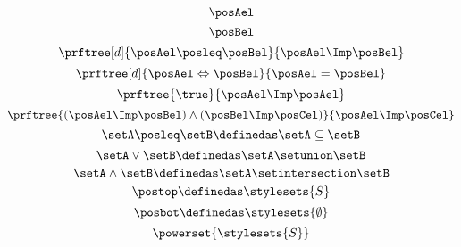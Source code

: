 {\begin{forslides}
\begin{equation*}
            \label{eq:latt_4}
            \posAel
        \end{equation*}
        \begin{equation*}
            \label{eq:latt_5}
            \posBel
        \end{equation*}
        \begin{equation*}
            \label{eq:prop_1}
            \prftree[d]{\posAel \posleq \posBel}{\posAel \Imp \posBel}
        \end{equation*}
        \begin{equation*}
            \label{eq:prop_2}
            \prftree[d]{\posAel \Leftrightarrow \posBel}{\posAel = \posBel}
        \end{equation*}
        \begin{equation*}
            \label{eq:prop_3}
            \prftree{\true}{\posAel \Imp \posAel}
        \end{equation*}
        \begin{equation*}
            \label{eq:prop_4}
            \prftree{(\posAel \Imp \posBel)\wedge (\posBel \Imp \posCel)}{\posAel \Imp \posCel}
        \end{equation*}
        \begin{equation*}
            \label{eq:pow_1}
            \setA \posleq \setB \definedas \setA \subseteq \setB
        \end{equation*}
        \begin{equation*}
            \label{eq:pow_2}
            \setA \vee \setB \definedas \setA \setunion \setB
        \end{equation*}
        \begin{equation*}
            \label{eq:pow_3}
            \setA \wedge \setB \definedas \setA \setintersection \setB
        \end{equation*}
        \begin{equation*}
            \label{eq:pow_4}
            \postop \definedas \stylesets{S}
        \end{equation*}
        \begin{equation*}
            \label{eq:pow_5}
            \posbot \definedas \stylesets{\emptyset}
        \end{equation*}
        \begin{equation*}
            \label{eq:pow_6}
            \powerset{\stylesets{S}}
        \end{equation*}
        \begin{equation*}

\end{equation*}
\end{forslides}}
